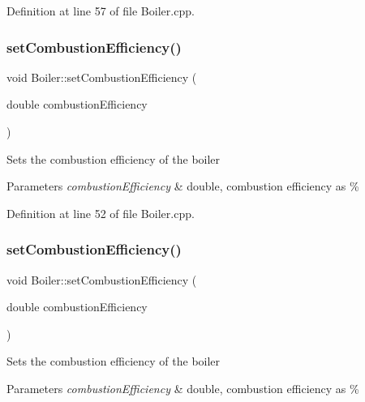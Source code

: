 Definition at line 57 of file Boiler.\+cpp.

\mbox{\label{class_boiler_abef6bc48101f98f0650cb07fb1d51f74}} 
\subsubsection{\texorpdfstring{set\+Combustion\+Efficiency()}{setCombustionEfficiency()}\hspace{0.1cm}{\footnotesize\ttfamily [1/3]}}
{\footnotesize\ttfamily void Boiler\+::set\+Combustion\+Efficiency (\begin{DoxyParamCaption}\item[{double}]{combustion\+Efficiency }\end{DoxyParamCaption})}

Sets the combustion efficiency of the boiler 
\begin{DoxyParams}{Parameters}
{\em combustion\+Efficiency} & double, combustion efficiency as \% \\
\hline
\end{DoxyParams}


Definition at line 52 of file Boiler.\+cpp.

\mbox{\label{class_boiler_abef6bc48101f98f0650cb07fb1d51f74}} 
\subsubsection{\texorpdfstring{set\+Combustion\+Efficiency()}{setCombustionEfficiency()}\hspace{0.1cm}{\footnotesize\ttfamily [2/3]}}
{\footnotesize\ttfamily void Boiler\+::set\+Combustion\+Efficiency (\begin{DoxyParamCaption}\item[{double}]{combustion\+Efficiency }\end{DoxyParamCaption})}

Sets the combustion efficiency of the boiler 
\begin{DoxyParams}{Parameters}
{\em combustion\+Efficiency} & double, combustion efficiency as \% \\
\hline
\end{DoxyParams}
\mbox{\label{class_boiler_abef6bc48101f98f0650cb07fb1d51f74}} 
